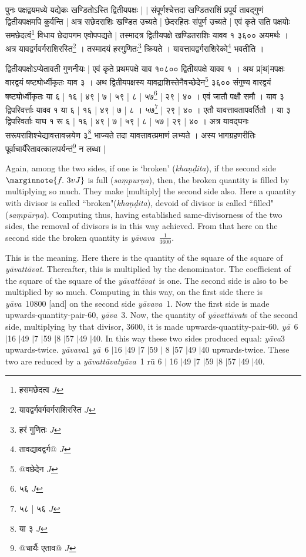 \documentclass[12pt]{book}
\def\yavattavat{\textit{y\=avat\-t\=avat}}
\def\ya{\textit{y\=a}}
\def\yava{\textit{y\=ava}}
\def\yavava{\textit{y\=avava}}
\def\danda{$|$}
\begin{document}
\newpage

{\s पुनः पक्षद्वयमध्ये यद्येकः खण्डितोऽस्ति द्वितीयपक्षः | $|$
संपूर्णश्चेत्तदा खण्डितराशिं प्रपूर्य तावद्गुणं द्वितीयपक्षमपि कुर्वन्ति | अत्र सछेदराशिः खण्डित
उच्यते | छेदरहितः संपुर्ण उच्यते | एवं कृते सति पक्षयोः समछेदत्वं\footnote{{\s हसमछेदत्व} $J$} विधाय छेदापगम
एवोपपद्यते | तस्मादत्र द्वितीयपक्षे खण्डितराशिः यावव १ ३६०० अयमर्थः । अत्र
यावद्वर्गवर्गराशिरस्ति\footnote{{\s यावद्वर्गवर्गवर्गराशिरस्ति} $J$} । तस्मादयं हरगुणितः\footnote{{\s हरं गुणितः} $J$} क्रियते । यावत्तावद्वर्गराशिरेको\footnote{{\s तावद्यावद्वर्ग@} $J$} भवतीति । 

द्वितीयपक्षोऽप्येतावती गुणनीयः | एवं कृते प्रथमपक्षे याव १०८०० द्वितीयपक्षे यावव १ । अथ प्र[थ]मपक्षः
वारद्वयं षष्ट्योर्ध्वीकृतः याव ३ । अथ द्वितीयपक्षस्य यावद्राशिस्तेनैवच्छेदेन\footnote{{\s @वछेदेन} $J$} ३६०० संगुण्य
वारद्वयं षष्ट्योर्ध्वीकृतः या ६ | १६ | ४९ | ७ | ५९ | ८ | ५७\footnote{{\s ५६} $J$} | २९ | ४० । एवं जातौ पक्षौ समौ । याव ३ द्विपरिवर्त्ताः यावव १ या ६ | १६ | ४९ | ७ |
८ । ५७\footnote{{\s ५८ | ५६} $J$} | २९ | ४० । एतौ यावत्तावतापवर्तितौ । या ३ द्विपरिवर्ताः याघ १ रू ६ | १६ | ४९ | ७ |
५९ | ८ | ५७ | २९ | ४० । अत्र यावद्घनः सरूपराशिश्चेद्यावत्तावत्त्रयेण ३\footnote{{\s या ३} $J$} भाज्यते तदा यावत्तावत्प्रमाणं
लभ्यते । अस्य भागग्रहणरीतिः पूर्वाचार्यैरेतावत्कालपर्यन्तं\footnote{{\s @चार्यैः एताव@} $J$} न लब्धा |}

\newpage

Again, among the two sides, if one is `broken' (\textit{kha\d n\d dita}), if the second side $\marginnote{f.~3v J}$
is full (\textit{sa\d mpur\d na}), then, the broken quantity is filled by multiplying so much. They make [multiply] the second side also.  Here a quantity with divisor is called ``broken"(\textit{kha\d n\d dita}), devoid of divisor is called ``filled"
(\textit{sa\d mp\=ur\d na}).  Computing thus, having established same-divisorness of the two sides, the removal of divisors is in this way achieved.  
From that here on the second side the broken quantity is \yavava\  $\frac{1}{3600}$. 

This is the meaning.  Here there is the quantity of the square of the square of \yavattavat. Thereafter, this is multiplied by the denominator. The coefficient of the square of the square of the \yavattavat\ is one. The second side is also to be multiplied by so much.  Computing in this way, on 
the first side there is \yava\ 10800 [and] on the second side \yavava\ 1. Now the 
first side is made upwards-quantity-pair-60, \yava\ 3.  Now, the quantity of \yavattavat s 
of the second side, multiplying by that divisor, 3600, it is made upwards-quantity-pair-60. 
\ya\ 6 \danda 16 \danda 49 \danda 7 \danda 59 \danda 8 \danda 57 \danda 49 \danda 40.  In this way these two sides  produced equal: \yava 3 upwards-twice. \yavava 1 \ya\ 6 \danda 16 \danda 49 \danda 7 \danda 59 \danda 
8 \danda 57 \danda 49 \danda 40 upwards-twice. These two are reduced 
by a \yavattavat  \yava\ 1 r\=u 6 \danda 
16 \danda 49 \danda 7 \danda 59 \danda 8 \danda 57 \danda 49 \danda 40.
\end{document}
